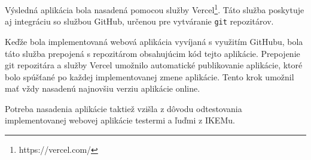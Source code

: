 Výsledná aplikácia bola nasadená pomocou služby Vercel\footnote{https://vercel.com/}. Táto služba poskytuje aj integráciu so službou GitHub, určenou pre vytváranie \texttt{git} repozitárov.

\clearpage

Keďže bola implementovaná webová aplikácia vyvíjaná s využitím GitHubu, bola táto služba prepojená s repozitárom obsahujúcim kód tejto aplikácie. Prepojenie git repozitára a služby Vercel umožnilo automatické publikovanie aplikácie, ktoré bolo spúšťané po každej implementovanej zmene aplikácie. Tento krok umožnil mať vždy nasadenú najnovšiu verziu aplikácie online.

Potreba nasadenia aplikácie taktiež vzišla z dôvodu odtestovania implementovanej webovej aplikácie testermi a ľuďmi z IKEMu.